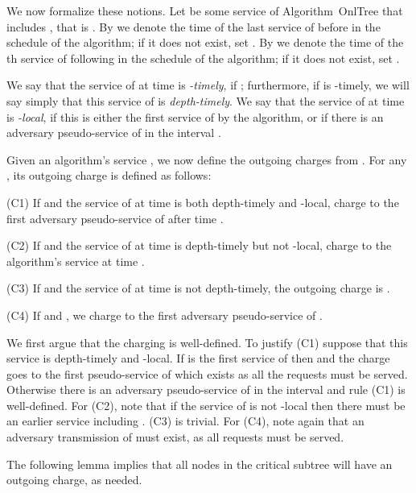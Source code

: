\documentclass[a4paper]{article}
\newcommand{\OnAlgTreesGeneral}{{\sc OnlTree}}
\begin{document}
\smallskip

We now formalize these notions.
Let  be some service of Algorithm~{\OnAlgTreesGeneral} that includes ,
that is .
By  we denote the time of the last service of  before
 in the schedule of the algorithm; if it does not exist, set
.
By  we denote the time of the th service of 
following  in the schedule of the algorithm; if it does not exist,
set .

We say that the service of  at time  is \emph{-timely}, if
; furthermore, if  is
-timely, we will say simply that this service of  is
\emph{depth-timely}.
We say that the service of  at time  is \emph{-local}, if
this is either the first service of  by the algorithm, or if
there is an adversary pseudo-service of  in the interval
.


Given an algorithm's service , we now define the outgoing
charges from .  For any , its outgoing charge is
defined as follows:
\begin{description}
	
\item{(C1)} If  and the service of  at time  is both
  depth-timely and -local, charge  to the first
  adversary pseudo-service of  after time .

\item{(C2)} If  and the service of  at time  is 
  depth-timely but not -local, charge  
  to the algorithm's service at time .

\item{(C3)} If  and the service of  at time  is not
  depth-timely, the outgoing charge is .

\item{(C4)} If  and , we charge  to the
first adversary pseudo-service of .
\end{description}

We first argue that the charging is well-defined. 
To justify (C1) suppose that this service is depth-timely and
-local.  If  is the first service of  then  and the charge goes to the first pseudo-service of 
which exists as all the requests must be served. Otherwise there
is an adversary pseudo-service of  in the interval
 and rule (C1) is well-defined.
For (C2), note that if the service  of  is not -local
then there must be an earlier service including .  (C3) is
trivial. For (C4), note again that an adversary transmission of 
must exist, as all requests must be served.

The following lemma implies that
all nodes in the critical subtree will have an outgoing charge, as needed.
\end{document}
